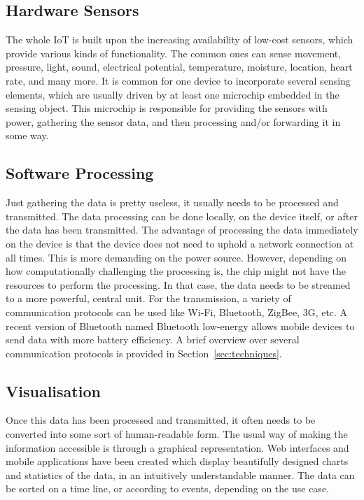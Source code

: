 \subsection{Hardware Sensors}
\label{sec:hardwareSensors}
The whole IoT is built upon the increasing availability of low-cost sensors, which provide various kinds of functionality.
The common ones can sense movement, pressure, light, sound, electrical potential, temperature, moisture, location, heart rate, and many more.
It is common for one device to incorporate several sensing elements, which are usually driven by at least one microchip embedded in the sensing object.
This microchip is responsible for providing the sensors with power, gathering the sensor data, and then processing and/or forwarding it in some way.

\subsection{Software Processing} 
\label{sec:softwareProcessing}
Just gathering the data is pretty useless, it usually needs to be processed and transmitted. 
The data processing can be done locally, on the device itself, or after the data has been transmitted. 
The advantage of processing the data immediately on the device is that the device does not need to uphold a network connection at all times. 
This is more demanding on the power source. 
However, depending on how computationally challenging the processing is, the chip might not have the resources to perform the processing. 
In that case, the data needs to be streamed to a more powerful, central unit. 
For the transmission, a variety of communication protocols can be used like Wi-Fi, Bluetooth, ZigBee, 3G, etc. 
A recent version of Bluetooth named Bluetooth low-energy allows mobile devices to send data with more battery efficiency. A brief overview over several communication protocols is provided in Section~\ref{sec:techniques}.

\subsection{Visualisation}
\label{sec:visualisation}
Once this data has been processed and transmitted, it often needs to be converted into some sort of human-readable form. The usual way of making the information accessible is through a graphical representation. 
Web interfaces and mobile applications have been created which display beautifully designed charts and statistics of the data, in an intuitively understandable manner. 
The data can be sorted on a time line, or according to events, depending on the use case.

